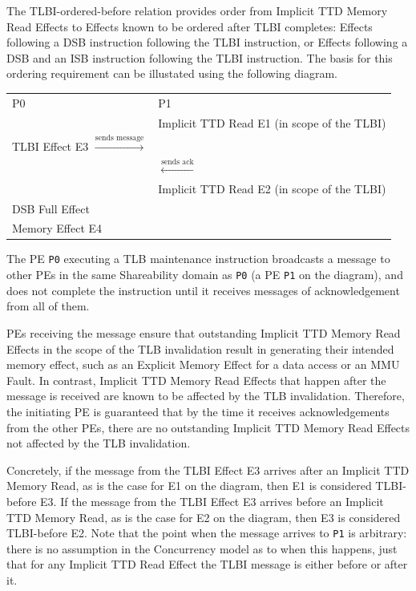 \documentclass{book}
\begin{document}
The TLBI-ordered-before relation provides order from Implicit TTD Memory Read
Effects to Effects known to be ordered after TLBI completes: Effects following a
DSB instruction following the TLBI instruction, or Effects following a DSB and
an ISB instruction following the TLBI instruction. The basis for this ordering
requirement can be illustated using the following diagram.

\begin{center}
\begin{tabular}{l l}
P0                                 &  P1                                        \\
                                   &  Implicit TTD Read E1 (in scope of the TLBI) \\
TLBI Effect E3 $\xrightarrow{\text{sends message}}$ &                                            \\
                                   & $\xleftarrow{\text{sends ack}}$                   \\
                                   &  Implicit TTD Read E2 (in scope of the TLBI)  \\
DSB Full Effect                    &                                            \\
Memory Effect E4                   &                                            \\
\end{tabular}
\end{center}

The PE \texttt{P0} executing a TLB maintenance instruction broadcasts a message
to other PEs in the same Shareability domain as \texttt{P0} (a PE \texttt{P1} on
the diagram), and does not complete the instruction until it receives messages
of acknowledgement from all of them.

PEs receiving the message ensure that outstanding Implicit TTD Memory Read
Effects in the scope of the TLB invalidation result in generating their intended
memory effect, such as an Explicit Memory Effect for a data access or an MMU
Fault. In contrast, Implicit TTD Memory Read Effects that happen after the
message is received are known to be affected by the TLB invalidation. Therefore,
the initiating PE is guaranteed that by the time it receives acknowledgements
from the other PEs, there are no outstanding Implicit TTD Memory Read Effects
not affected by the TLB invalidation.

Concretely, if the message from the TLBI Effect E3 arrives after an Implicit TTD
Memory Read, as is the case for E1 on the diagram, then E1 is considered
TLBI-before E3. If the message from the TLBI Effect E3 arrives before an
Implicit TTD Memory Read, as is the case for E2 on the diagram, then E3 is
considered TLBI-before E2. Note that the point when the message arrives to
\texttt{P1} is arbitrary: there is no assumption in the Concurrency model as to
when this happens, just that for any Implicit TTD Read Effect the TLBI message
is either before or after it. 
\end{document}
